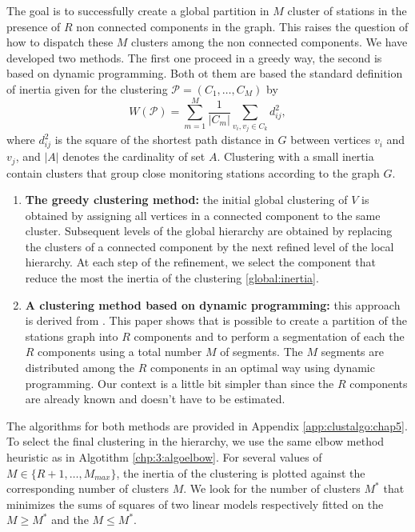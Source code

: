 The goal is to successfully create a global partition in $M$ cluster of stations in the presence of $R$ non connected components in the graph. This raises the question of how to dispatch these $M$ clusters among the non connected components. We have developed two methods. The first one proceed in a greedy way, the second is based on dynamic programming. Both ot them are based the standard definition of inertia given for the clustering $\mathcal{P}=(C_1,\ldots, C_M)$ by
\begin{equation}\label{global:inertia}
    W(\mathcal{P}) = \sum_{m=1}^M \frac{1}{|C_m|}\sum_{v_i, v_j \in C_k}d^2_{ij},
\end{equation} 
where $d^2_{ij}$ is the square of the shortest path distance in $G$ between vertices $v_i$ and $v_j$, and $|A|$ denotes the cardinality of set $A$. Clustering with a small inertia contain clusters that group close monitoring stations according to the graph $G$.
\begin{enumerate}
    \item \textbf{The greedy clustering method:} the initial global clustering of $V$ is obtained by assigning all vertices in a connected component to the same cluster. Subsequent levels of the global hierarchy are obtained by replacing the clusters of a connected component by the next refined level of the local hierarchy. At each step of the refinement, we select the component that reduce the most the inertia of the clustering \ref{global:inertia}.
    \item \textbf{A clustering method based on dynamic programming:} this approach is derived from \cite{hebrail2010exploratory}. This paper shows that is possible to create a partition of the stations graph into $R$ components and to perform a segmentation of each the $R$ components using a total number $M$ of segments. The $M$ segments are distributed among the $R$ components in an optimal way using dynamic programming. Our context is a little bit simpler than \cite{hebrail2010exploratory} since the $R$ components are already known and doesn't have to be estimated. 
\end{enumerate}
The algorithms for both methods are provided in Appendix \ref{app:clustalgo:chap5}. To select the final clustering in the hierarchy, we use the same elbow method heuristic as in Algotithm \ref{chp:3:algoelbow}. For several values of $M\in\{R+1,\dots,M_{max}\}$, the inertia of the clustering is plotted against the corresponding number of clusters $M$. We look for the number of clusters $M^*$ that minimizes the sums of squares of two linear models respectively fitted on the $M \geq M^*$ and the $M \leq M^*$.      

